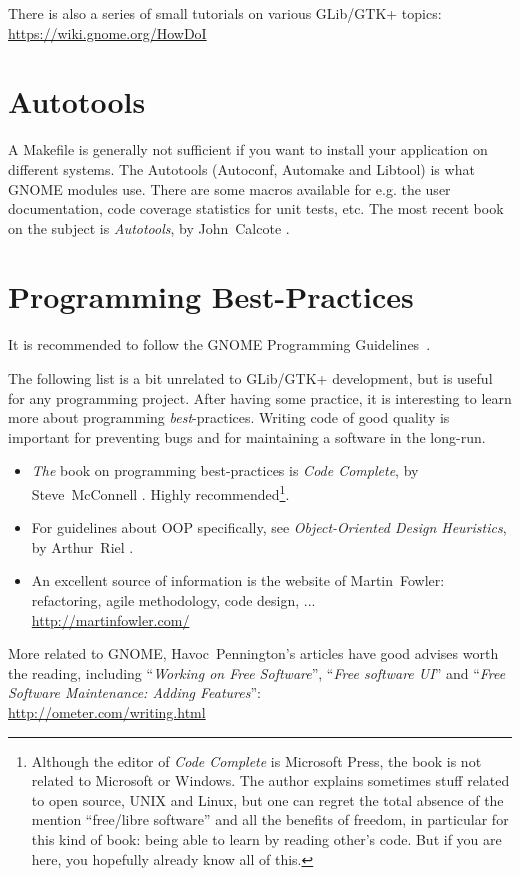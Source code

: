 There is also a series of small tutorials on various GLib/GTK+ topics:\\
\url{https://wiki.gnome.org/HowDoI}

\section{Autotools}

A Makefile is generally not sufficient if you want to install your application on different systems. The Autotools (Autoconf, Automake and Libtool) is what GNOME modules use. There are some macros available for e.g. the user documentation, code coverage statistics for unit tests, etc. The most recent book on the subject is \emph{Autotools}, by John~Calcote \cite{autotools}.

\section{Programming Best-Practices}

It is recommended to follow the GNOME Programming Guidelines~\cite{gnome-programming-guidelines}.

The following list is a bit unrelated to GLib/GTK+ development, but is useful for any programming project. After having some practice, it is interesting to learn more about programming \emph{best}-practices. Writing code of good quality is important for preventing bugs and for maintaining a software in the long-run.

\begin{itemize}
  \item \emph{The} book on programming best-practices is \emph{Code Complete}, by Steve~McConnell \cite{code-complete}. Highly recommended\footnote{Although the editor of \emph{Code Complete} is Microsoft Press, the book is not related to Microsoft or Windows. The author explains sometimes stuff related to open source, UNIX and Linux, but one can regret the total absence of the mention ``free/libre software'' and all the benefits of freedom, in particular for this kind of book: being able to learn by reading other's code. But if you are here, you hopefully already know all of this.}.

  \item For guidelines about OOP specifically, see \emph{Object-Oriented Design Heuristics}, by Arthur~Riel \cite{oop-book}.

  \item An excellent source of information is the website of Martin~Fowler: refactoring, agile methodology, code design, ...\\
  \url{http://martinfowler.com/}
\end{itemize}

More related to GNOME, Havoc~Pennington's articles have good advises worth the reading, including ``\emph{Working on Free Software}'', ``\emph{Free software UI}'' and ``\emph{Free Software Maintenance: Adding Features}'':\\
\url{http://ometer.com/writing.html}
